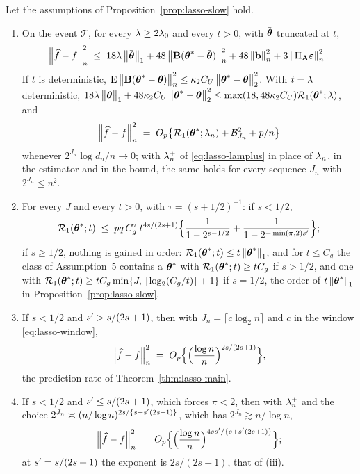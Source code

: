 \begin{proposition}
\label{prop:lasso-truncated}
Let the assumptions of Proposition~\ref{prop:lasso-slow} hold.
\begin{enumerate}
\item[(i)] On the event $\mathcal{T}$, for every $\lambda \ge 2\lambda_0$ and
every $t > 0$, with $\bar{\boldsymbol{\theta}}$ truncated at $t$,
\[
  \left\lVert \widehat{f}-f \right\rVert_{n}^{2}
  \;\le\; 18\lambda\left\lVert \bar{\boldsymbol{\theta}} \right\rVert_{1} + 48\left\lVert \mathbf{B}(\boldsymbol{\theta}^{*}-\bar{\boldsymbol{\theta}}) \right\rVert_{n}^{2}
  + 48\left\lVert \mathbf{b} \right\rVert_{n}^{2} + 3\left\lVert \Pi_{\mathbf{A}}\boldsymbol{\varepsilon} \right\rVert_{n}^{2} .
\]
If $t$ is deterministic,
$\mathrm{E}\left\lVert \mathbf{B}(\boldsymbol{\theta}^{*}-\bar{\boldsymbol{\theta}}) \right\rVert_{n}^{2} \le
\kappa_2C_U\left\lVert \boldsymbol{\theta}^{*}-\bar{\boldsymbol{\theta}} \right\rVert_{2}^{2}$. With $t = \lambda$ deterministic,
$18\lambda\left\lVert \bar{\boldsymbol{\theta}} \right\rVert_{1} + 48\kappa_2C_U\left\lVert \boldsymbol{\theta}^{*}-\bar{\boldsymbol{\theta}} \right\rVert_{2}^{2} \le
\max(18,48\kappa_2C_U)\mathcal{R}_{1}(\boldsymbol{\theta}^{*};\lambda)$, and
\[
  \left\lVert \widehat{f}-f \right\rVert_{n}^{2} \;=\; O_p\bigl\{\mathcal{R}_{1}(\boldsymbol{\theta}^{*};\lambda_{n})
  + \mathcal{B}_{J_n}^{2} + p/n\bigr\}
\]
whenever $2^{J_n}\log d_n/n \to 0$; with $\lambda_{n}^{+}$ of
\eqref{eq:lasso-lamplus} in place of $\lambda_{n}$, in the estimator and in the
bound, the same holds for every sequence $J_n$ with $2^{J_n} \le n^{2}$.
\item[(ii)] For every $J$ and every $t > 0$, with $\tau = (s+1/2)^{-1}$: if
$s < 1/2$,
\begin{equation}
  \label{eq:count-lasso-truncated}
  \mathcal{R}_{1}(\boldsymbol{\theta}^{*};t) \;\le\; pq\,C_g^{\tau}\,t^{4s/(2s+1)}
  \Bigl\{\frac{1}{1-2^{s-1/2}} + \frac{1}{1-2^{-\min(\pi,2)s'}}\Bigr\};
\end{equation}
if $s \ge 1/2$, nothing is gained in order: $\mathcal{R}_{1}(\boldsymbol{\theta}^{*};t) \le
t\left\lVert \boldsymbol{\theta}^{*} \right\rVert_{1}$, and for $t \le C_g$ the class of Assumption~5
contains a $\boldsymbol{\theta}^{*}$ with $\mathcal{R}_{1}(\boldsymbol{\theta}^{*};t) \ge tC_g$ if $s > 1/2$,
and one with $\mathcal{R}_{1}(\boldsymbol{\theta}^{*};t) \ge
tC_g\min\{J,\,\lfloor\log_2(C_g/t)\rfloor + 1\}$ if $s = 1/2$, the order of
$t\left\lVert \boldsymbol{\theta}^{*} \right\rVert_{1}$ in Proposition~\ref{prop:lasso-slow}.
\item[(iii)] If $s < 1/2$ and $s' > s/(2s+1)$, then with
$J_n = \lceil c\log_2 n\rceil$ and $c$ in the window \eqref{eq:lasso-window},
\[
  \left\lVert \widehat{f}-f \right\rVert_{n}^{2}
  \;=\; O_p\Bigl\{\Bigl(\frac{\log n}{n}\Bigr)^{2s/(2s+1)}\Bigr\},
\]
the prediction rate of Theorem~\ref{thm:lasso-main}.
\item[(iv)] If $s < 1/2$ and $s' \le s/(2s+1)$, which forces $\pi < 2$,
then with $\lambda_{n}^{+}$ and the choice
$2^{J_n} \asymp (n/\log n)^{2s/\{s+s'(2s+1)\}}$, which has
$2^{J_n} \gtrsim n/\log n$,
\[
  \left\lVert \widehat{f}-f \right\rVert_{n}^{2}
  \;=\; O_p\Bigl\{\Bigl(\frac{\log n}{n}\Bigr)^{4ss'/\{s+s'(2s+1)\}}\Bigr\};
\]
at $s' = s/(2s+1)$ the exponent is $2s/(2s+1)$, that of (iii).
\end{enumerate}
\end{proposition}

